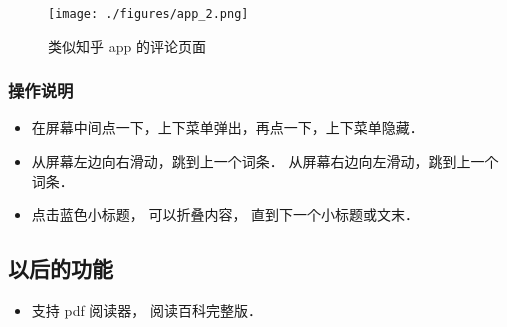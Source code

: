 \begin{figure}[ht]
\centering
\texttt{[image: ./figures/app\_2.png]}
\caption{类似知乎 app 的评论页面} \label{app_fig2}
\end{figure}

\subsubsection{操作说明}
\begin{itemize}
\item 在屏幕中间点一下，上下菜单弹出，再点一下，上下菜单隐藏．
\item 从屏幕左边向右滑动，跳到上一个词条． 从屏幕右边向左滑动，跳到上一个词条．
\item 点击蓝色小标题， 可以折叠内容， 直到下一个小标题或文末．
\end{itemize}

\subsection{以后的功能}
\begin{itemize}
\item 支持 pdf 阅读器， 阅读百科完整版．
\end{itemize}
